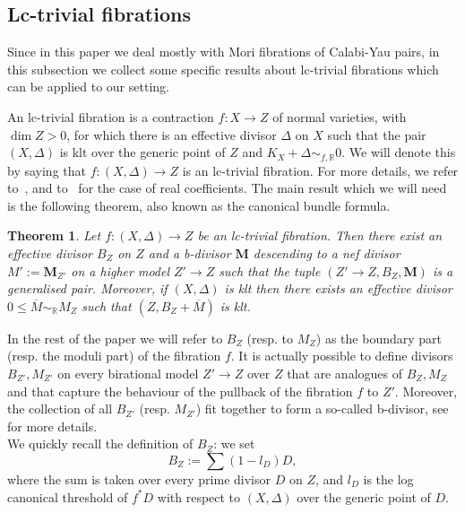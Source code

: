 \documentclass{amsart}[12pt,a4paper]
\newtheorem{theorem}{Theorem}[section]
\theoremstyle{definition}
\newcommand{\rr}{\mathbb{R}}
\begin{document}
\subsection{Lc-trivial fibrations}
\label{lc.trivial.fibrations}

Since in this paper we deal mostly with Mori fibrations of Calabi-Yau pairs, in this subsection we collect some specific results about lc-trivial fibrations which can be applied to our setting. 

An lc-trivial fibration is a contraction $f \colon X\rightarrow Z$ of normal varieties, with $\dim Z >0$, for which there is an effective divisor $\Delta$ on $X$ such that the pair $(X,\Delta)$ is klt over the generic point of $Z$ and $K_{X}+\Delta \sim_{f,\rr} 0$. 
We will denote this by saying that $f \colon (X, \Delta) \to Z$ is an lc-trivial fibration.
For more details, we refer to~\cite{Amb04, Amb05}, and to~\cite[Theorem~3.1]{MR2944479} for the case of real coefficients.   
The main result which we will need is the following theorem, also known as the canonical bundle formula.

\begin{theorem}
\label{bundle}
Let $f \colon (X, \Delta)\rightarrow Z$ be an lc-trivial fibration.
Then there exist an effective divisor $B_{Z}$ on $Z$ and a b-divisor $\mathbf M$ descending to a nef divisor $M':=\mathbf M_{Z'}$ on a higher model $Z' \to Z$
such that the tuple $(Z' \to Z, B_Z, \mathbf M)$ is a generalised pair.
Moreover, if $(X,\Delta)$ is klt then there exists an effective divisor $0 \leq \overline{M} \sim_\rr M_Z$ such that $(Z,B_{Z} +\overline{M})$ is klt.
\end{theorem}

In the rest of the paper we will refer to $B_Z$ (resp. to $M_Z$) as the boundary part (resp. the moduli part) of the fibration $f$.
It is actually possible to define divisors $B_{Z'}, M_{Z'}$ on every birational model $Z' \to Z$ over $Z$ that are analogues of $B_Z, M_Z$ and that capture the behaviour of the pullback of the fibration $f$ to $Z'$.
Moreover, the collection of all $B_{Z'}$ (resp. $M_{Z'}$) fit together to form a so-called b-divisor, see~\cite[\S~2]{Amb04} for more details.
\\
We quickly recall the definition of $B_Z$: we set 
\begin{equation}
\label{def.bound.part.eqn}
B_Z := \sum (1-l_D) D,
\end{equation} 
where the sum is taken over every prime divisor $D$ on $Z$, and $l_D$ is the log canonical threshold of $f^*D$ with respect to $(X,\Delta)$ over the generic point of $D$. 
\end{document}
